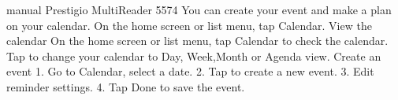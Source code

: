 manual Prestigio MultiReader 5574
You can create your event and make a plan on your calendar. On the home screen or list menu, 
    tap Calendar. View the calendar On the home screen or list menu, tap Calendar to check the 
    calendar. Tap to change your calendar to Day, Week,Month or Agenda view. Create an event 
1. Go to Calendar, select a date. 
2. Tap to create a new event. 
3. Edit reminder settings. 
4. Tap Done to save the event. 
